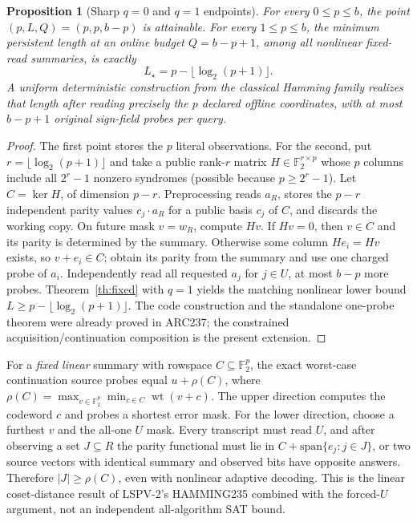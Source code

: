 \documentclass[10pt]{article}
\newtheorem{proposition}[theorem]{Proposition}
\newcommand{\F}{\mathbb F_2}
\begin{document}
\begin{proposition}[Sharp $q=0$ and $q=1$ endpoints]\label{prop:sharp}
For every $0\le p\le b$, the point $(p,L,Q)=(p,p,b-p)$ is attainable. For every $1\le p\le b$, the minimum persistent length at an online budget $Q=b-p+1$, among \emph{all nonlinear fixed-read summaries}, is exactly
\[
 \boxed{L_\star=p-\lfloor\log_2(p+1)\rfloor.}
\]
A uniform deterministic construction from the classical Hamming family realizes that length after reading precisely the $p$ declared offline coordinates, with at most $b-p+1$ original sign-field probes per query.
\end{proposition}
\begin{proof}
The first point stores the $p$ literal observations. For the second, put $r=\lfloor\log_2(p+1)\rfloor$ and take a public rank-$r$ matrix $H\in\F^{r\times p}$ whose $p$ columns include all $2^r-1$ nonzero syndromes (possible because $p\ge2^r-1$). Let $C=\ker H$, of dimension $p-r$. Preprocessing reads $a_R$, stores the $p-r$ independent parity values $c_j\cdot a_R$ for a public basis $c_j$ of $C$, and discards the working copy. On future mask $v=w_R$, compute $Hv$. If $Hv=0$, then $v\in C$ and its parity is determined by the summary. Otherwise some column $He_i=Hv$ exists, so $v+e_i\in C$; obtain its parity from the summary and use one charged probe of $a_i$. Independently read all requested $a_j$ for $j\in U$, at most $b-p$ more probes. Theorem~\ref{th:fixed} with $q=1$ yields the matching nonlinear lower bound $L\ge p-\lfloor\log_2(p+1)\rfloor$. The code construction and the standalone one-probe theorem were already proved in ARC237; the constrained acquisition/continuation composition is the present extension.\end{proof}

For a \emph{fixed linear} summary with rowspace $C\subseteq\F^p$, the exact worst-case continuation source probes equal $u+\rho(C)$, where $\rho(C)=\max_{v\in\F^p}\min_{c\in C}\operatorname{wt}(v+c)$. The upper direction computes the codeword $c$ and probes a shortest error mask. For the lower direction, choose a furthest $v$ and the all-one $U$ mask. Every transcript must read $U$, and after observing a set $J\subseteq R$ the parity functional must lie in $C+\mathrm{span}\{e_j:j\in J\}$, or two source vectors with identical summary and observed bits have opposite answers. Therefore $|J|\ge\rho(C)$, even with nonlinear adaptive decoding. This is the linear coset-distance result of LSPV-2's HAMMING235 combined with the forced-$U$ argument, not an independent all-algorithm SAT bound.
\end{document}
